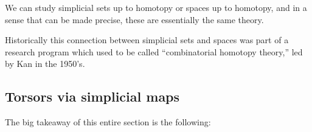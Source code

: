 \documentclass[11pt]{amsart}
\begin{document}
\begin{remark} We can study simplicial sets up to homotopy or spaces up to homotopy, and in a sense that can be made precise, these are essentially the same theory.
\end{remark}

\begin{remark} Historically this connection between simplicial sets and spaces was part of a research program which used to be called ``combinatorial homotopy theory,'' led by Kan in the 1950's. %
\end{remark}





\subsection{Torsors via simplicial maps}

The big takeaway of this entire section is the following:
\end{document}
